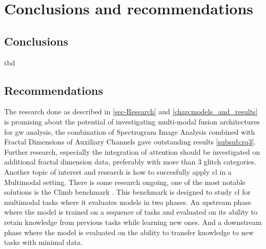 \chapter{Conclusions and recommendations}
\label{ch:6}
\section{Conclusions}
tbd
\section{Recommendations}
The research done as described in \ref{sec-Research} and \ref{chap:models_and_results} is promising about the potential of investigating multi-modal fusion architectures for \acrshort{gw} analysis, the combination of Spectrogram Image Analysis combined with Fractal Dimensions of Auxiliary Channels gave outstanding results \ref{subsub:rq3}. \\
Further research, especially the integration of attention \citep{vaswani2017attention, niu2021review} should be investigated on additional fractal dimension data, preferably with more than 3 glitch categories. \\
Another topic of interest and research is how to succesfully apply \acrshort{cl} in a Multimodal setting. There is some research ongoing, one of the most notable solutions is the Climb benchmark \citep{srinivasan2022climb}. This benchmark is designed to study \acrshort{cl} for multimodal tasks where it evaluates models in two phases. An upstream phase where the model is trained on a sequence of tasks and evaluated on its ability to retain knowledge from previous tasks while learning new ones. And a downstream phase where the model is evaluated on the ability to transfer knowledge to new tasks with minimal data. 